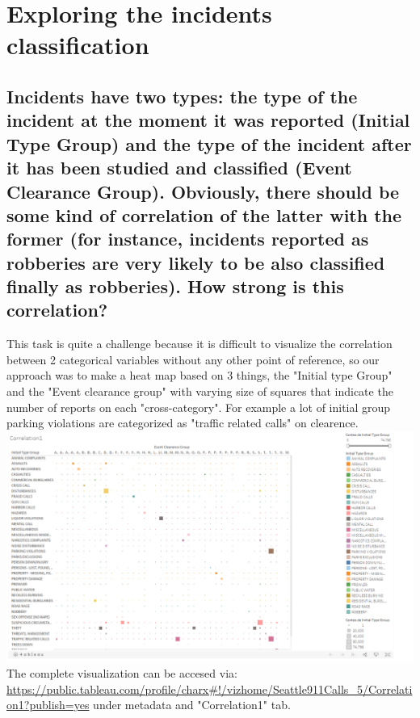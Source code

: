 \documentclass{article}
\begin{document}
    \section{Exploring the incidents classification}
    \subsection{Incidents have	 two	 types:	 the type of the	incident	 at	 the	moment	it	 was	 reported (Initial	 Type	 Group)	 and	 the	 type	 of	 the	 incident	 after	 it	 has been studied and classified (Event	 Clearance	Group).	Obviously, there should be some kind of correlation of the latter with the former (for instance, incidents reported as robberies are very likely to be also classified finally as robberies). How strong is	this correlation?}
    This task is quite a challenge because it is difficult to visualize the correlation between 2 categorical variables without any other point of reference, so our approach was to make a heat map based on 3 things, the "Initial type Group" and the "Event clearance group" with varying size of squares that indicate the number of reports on each "cross-category". For example a lot of initial group parking violations are categorized as "traffic related calls" on clearence. 
    \\
    \includegraphics[width=\textwidth]{VisualAnalytics/Assignment2/images/Correlation1.PNG}
    \\
    The complete visualization can be accesed via: \url{https://public.tableau.com/profile/charx#!/vizhome/Seattle911Calls_5/Correlation1?publish=yes} under metadata and "Correlation1" tab.
    
\end{document}
